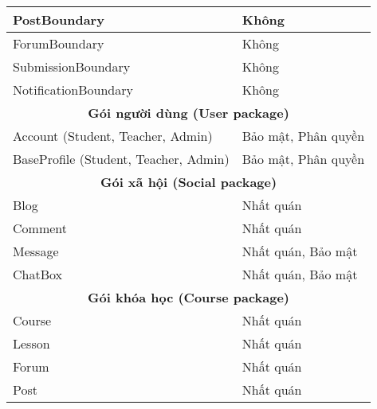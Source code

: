 \documentclass[./../main_file.tex]{subfiles}
\begin{document}
\begin{longtable}{|p{}|p{}|}
			PostBoundary                          & Không                                                         \\ \hline
			ForumBoundary                         & Không                                                         \\ \hline
			SubmissionBoundary                    & Không                                                         \\ \hline
			NotificationBoundary                  & Không                                                         \\ \hline
			\multicolumn{2}{|c|}{\textbf{Gói người dùng (User package)}}                                          \\ \hline
			Account (Student, Teacher, Admin)     & Bảo mật, Phân quyền                                           \\ \hline
			BaseProfile (Student, Teacher, Admin) & Bảo mật, Phân quyền                                           \\ \hline
			\multicolumn{2}{|c|}{\textbf{Gói xã hội (Social package)}}                                            \\ \hline
			Blog                                  & Nhất quán                                                     \\ \hline
			Comment                               & Nhất quán                                                     \\ \hline
			Message                               & Nhất quán, Bảo mật                                            \\ \hline
			ChatBox                               & Nhất quán, Bảo mật                                            \\ \hline
			\multicolumn{2}{|c|}{\textbf{Gói khóa học (Course package)}}                                          \\ \hline
			Course                                & Nhất quán                                                     \\ \hline
			Lesson                                & Nhất quán                                                     \\ \hline
			Forum                                 & Nhất quán                                                     \\ \hline
			Post                                  & Nhất quán                                                     \\ \hline

\end{longtable}
\end{document}
